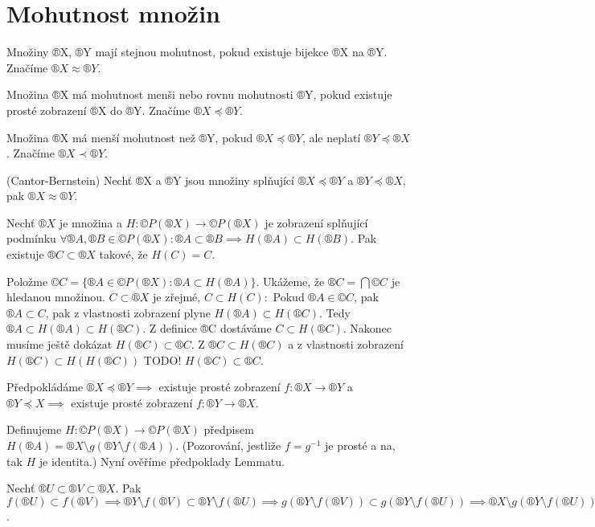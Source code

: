 \documentclass[12pt]{article}					%
\begin{document}
\section{Mohutnost množin}
    \begin{definice}
        Množiny ®X, ®Y mají stejnou mohutnost, pokud existuje bijekce ®X na ®Y. Značíme $®X ≈ ®Y$.

        Množina ®X má mohutnost menši nebo rovnu mohutnosti ®Y, pokud existuje prosté zobrazení ®X do ®Y. Značíme $®X \preceq ®Y$.

        Množina ®X má menší mohutnost než ®Y, pokud $®X \preceq ®Y$, ale neplatí $®Y \preceq ®X$. Značíme $®X \prec ®Y$.
    \end{definice}

    \begin{veta}(Cantor-Bernstein)
        Nechť ®X a ®Y jsou množiny splňující $®X \preceq ®Y$ a $®Y \preceq ®X$, pak $®X ≈ ®Y$.


        \begin{lemmain}
            Nechť $®X$ je množina a $H: ©P(®X) \rightarrow ©P(®X)$ je zobrazení splňující podmínku $\forall ®A, ®B \in ©P(®X): ®A \subset ®B \implies H(®A) \subset H(®B)$. Pak existuje $®C \subset ®X$ takové, že $H(C) = C$.
            \begin{dukazin}
                Položme $©C = \{®A \in ©P(®X): ®A \subset H(®A)\}$. Ukážeme, že $®C = \bigcap ©C$ je hledanou množinou. $C \subset ®X$ je zřejmé, $C \subset H(C):$ Pokud $®A \in ©C$, pak $®A \subset C$, pak z vlastnosti zobrazení plyne $H(®A) \subset H(®C)$. Tedy $®A \subset H(®A) \subset H(®C)$. Z definice ®C dostáváme $C \subset H(®C)$. Nakonec musíme ještě dokázat $H(®C) \subset ®C$. Z $®C \subset H(®C)$ a z vlastnosti zobrazení $H(®C)\subset H(H(®C))$ TODO! $H(®C) \subset ®C$.
            \end{dukazin}
        \end{lemmain}
        \begin{dukaz}
            Předpokládáme $®X \preceq ®Y \implies$ existuje prosté zobrazení $f: ®X \rightarrow ®Y$ a  $®Y \preceq X \implies$ existuje prosté zobrazení $f: ®Y \rightarrow ®X$.

            Definujeme $H: ©P(®X) \rightarrow ©P(®X)$ předpisem $H(®A) = ®X \setminus g(®Y \setminus f(®A))$. (Pozorování, jestliže $f = g^{-1}$ je prosté a na, tak $H$ je identita.) Nyní ověříme předpoklady Lemmatu.

            Nechť $®U \subset ®V \subset ®X$. Pak $f(®U) \subset f(®V) \implies ®Y \setminus f(®V) \subset ®Y \setminus f(®U) \implies g(®Y \setminus f(®V)) \subset g(®Y \setminus f(®U)) \implies ®X \setminus g(®Y \setminus f(®U)) \subset ®X \setminus g(®Y \setminus f(®V)) \implies H(®U) \subset H(®V)$.


\end{dukaz}
\end{veta}
\end{document}
